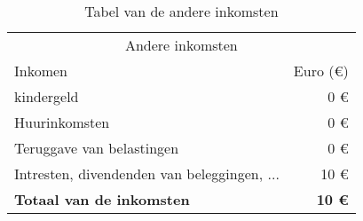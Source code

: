 \begin{table}[!htbp]
	\centering
	\begin{tabular}{@{}lr@{}} \toprule
		\multicolumn{2}{c}{Andere inkomsten} \\ \cmidrule(r){1-2}
		Inkomen    										& Euro (\euro{})\\ \midrule
		kindergeld      								& 0 \euro{}\\
		Huurinkomsten    								& 0 \euro{}\\
		Teruggave van belastingen       				& 0 \euro{}\\
		Intresten, divendenden van beleggingen, ...  	& 10 \euro{}\\
		\toprule
		\textbf{Totaal van de inkomsten}              	& \textbf{10 \euro{}}   \\ \bottomrule
	\end{tabular}
	\caption{Tabel van de andere inkomsten}
	\label{tab:tabelandereinkomsten}
\end{table}